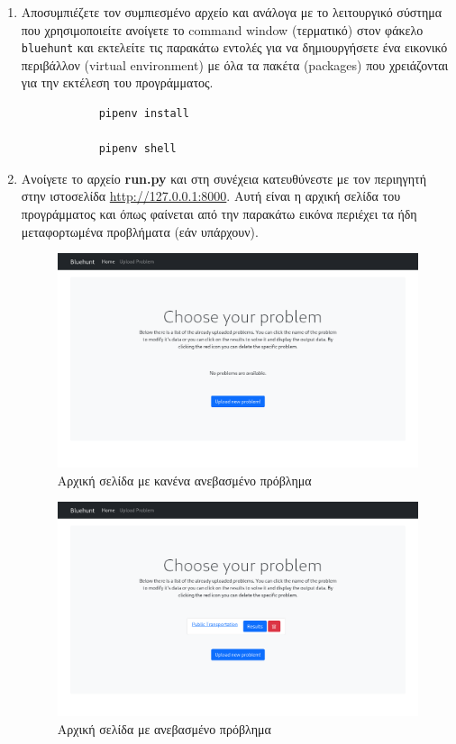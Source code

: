\documentclass[11pt,a4paper,titlepage]{article}
\numberwithin{equation}{section}
\begin{document}
\begin{enumerate}
	\item Αποσυμπιέζετε τον συμπιεσμένο αρχείο και ανάλογα με το λειτουργικό σύστημα που χρησιμοποιείτε ανοίγετε το command window (τερματικό) στον φάκελο \texttt{bluehunt} και εκτελείτε τις παρακάτω εντολές για να δημιουργήσετε ένα εικονικό περιβάλλον (virtual environment) με όλα τα πακέτα (packages) που χρειάζονται για την εκτέλεση του προγράμματος.
	
	\begin{verbatim}
			pipenv install
			
			pipenv shell
	\end{verbatim}
	
	\item Ανοίγετε το αρχείο \textbf{run.py} και στη συνέχεια κατευθύνεστε με τον περιηγητή στην ιστοσελίδα \url{http://127.0.0.1:8000}. Αυτή είναι η αρχική σελίδα του προγράμματος και όπως φαίνεται από την παρακάτω εικόνα περιέχει τα ήδη μεταφορτωμένα προβλήματα (εάν υπάρχουν).
	
	\begin{figure}[H]
		\centering
		\includegraphics[width=0.8\linewidth]{media/index_no_prob.png}
		\caption{Αρχική σελίδα με κανένα ανεβασμένο πρόβλημα}
		\label{fig:index_no_prob}
	\end{figure}
	
	\begin{figure}[H]
		\centering
		\includegraphics[width=0.8\linewidth]{media/index_with_prob.png}
		\caption{Αρχική σελίδα με ανεβασμένο πρόβλημα}
		\label{fig:index_with_prob}
	\end{figure}
	

\end{enumerate}
\end{document}
